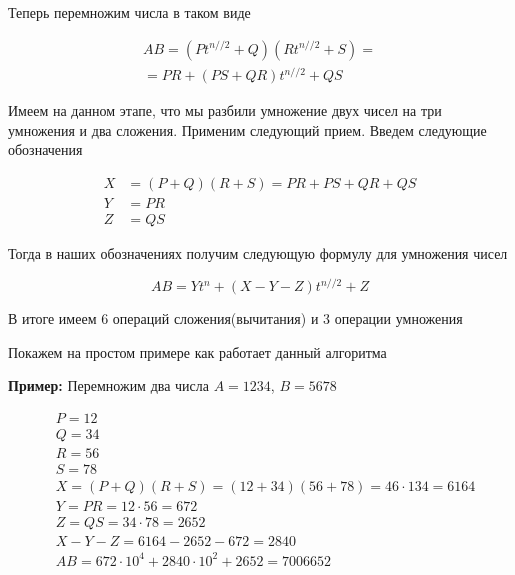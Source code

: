 \documentclass[a4paper,article,14pt]{extarticle}
\begin{document}
Теперь перемножим числа в таком виде 

\begin{equation}
    \begin{split}
    AB = \left(Pt^{n // 2} + Q \right)\left(Rt^{n // 2 } + S\right) = \\
    = PR + \left(PS + QR\right)t^{n // 2} + QS
    \end{split}
\end{equation}


Имеем на данном этапе, что мы разбили умножение двух чисел на три умножения и два сложения.
Применим следующий прием. Введем следующие обозначения

\begin{equation}
    \begin{split}
        X &= (P + Q)(R + S) = PR + PS + QR + QS \\
        Y &= PR \\
        Z &= QS 
    \end{split}
\end{equation}

Тогда в наших обозначениях получим следующую формулу для умножения чисел

\begin{equation}
    AB = Yt^{n} + (X - Y - Z)t^{n // 2} + Z
\end{equation}

В итоге имеем 6 операций сложения(вычитания) и 3 операции умножения

Покажем на простом примере как работает данный алгоритма

\textbf{Пример: } Перемножим два числа $ A = 1234 $, $ B = 5678 $

\begin{equation}
    \begin{split}
        &P = 12 \\
        &Q = 34 \\
        &R = 56 \\
        &S = 78 \\
        &X = (P + Q)(R + S) = (12 + 34)(56 + 78) = 46 \cdot 134 = 6164 \\
        &Y = PR = 12 \cdot 56 = 672 \\
        &Z = QS = 34 \cdot 78 = 2652 \\
        &X - Y - Z = 6164 - 2652 - 672 = 2840 \\
        &AB = 672 \cdot 10^4 + 2840 \cdot 10^2 + 2652 = 7006652 \\
    \end{split}
\end{equation}
\end{document}
